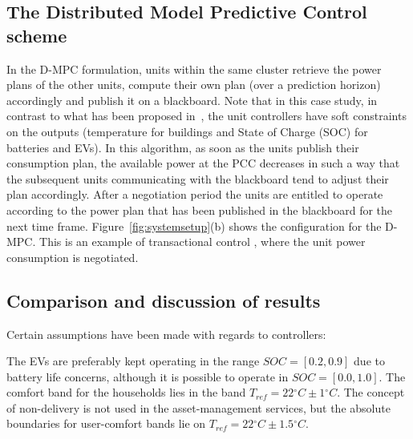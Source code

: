 \subsection{The Distributed Model Predictive Control scheme}
In the D-MPC formulation, units within the same cluster retrieve the power plans of the other units, compute their own plan (over a prediction horizon) accordingly and publish it on a blackboard. Note that in this case study, in contrast to what has been proposed in~\cite{Costanzo}, the unit controllers have soft constraints on the outputs (temperature for buildings and State of Charge (SOC) for batteries and EVs). In this algorithm, as soon as the units publish their consumption plan, the available power at the PCC decreases in such a way that the subsequent units communicating with the blackboard tend to adjust their plan accordingly. After a negotiation period the units are entitled to operate according to the power plan that has been published in the blackboard for the next time frame. Figure~\ref{fig:systemsetup}(b) shows the configuration for the D-MPC. This is an example of transactional control \cite{Kosek}, where the unit power consumption is negotiated.
\subsection{Comparison and discussion of results} \label{sub:comparison}
Certain assumptions have been made with regards to controllers:

The EVs are preferably kept operating in the range $SOC = [0.2,0.9]$ due to battery life concerns\cite{6345063}, although it is possible to operate in $SOC=[0.0,1.0]$.
The comfort band for the households lies in the band $T_{ref}=22{}^{\circ} C \pm 1{}^{\circ} C $. The concept of non-delivery is not used in the asset-management services, but the absolute boundaries for user-comfort bands lie on $T_{ref}=22{}^{\circ} C \pm 1.5{}^{\circ} C $.

